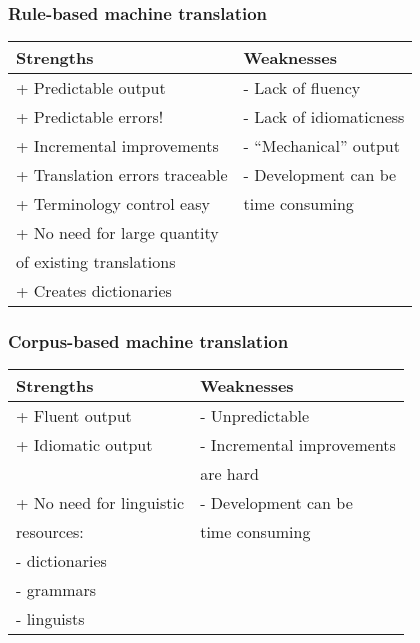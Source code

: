 \documentclass{beamer}
\begin{document}
\begin{frame}
  \frametitle{Rule-based machine translation}

\centering
\begin{tabular}{l|l}
\textbf{Strengths} & \textbf{Weaknesses}\\
\hline
+ Predictable output & - Lack of fluency \\
+ Predictable errors! & - Lack of idiomaticness \\
+ Incremental improvements & - ``Mechanical'' output \\ 
+ Translation errors traceable & - Development can be \\
+ Terminology control easy & \hfill time consuming \\
+ No need for large quantity & \\
\hfill of existing translations& \\
    + Creates dictionaries & \\
\hline
\end{tabular}


\end{frame}

\begin{frame}
  \frametitle{Corpus-based machine translation}

\centering
\begin{tabular}{l|l}
\textbf{Strengths} & \textbf{Weaknesses}\\
\hline
+ Fluent output & - Unpredictable \\
+ Idiomatic output & - Incremental improvements\\
                       & \hfill are hard \\
+ No need for linguistic & - Development can be \\
\hfill resources: & \hfill time consuming\\
\hfill - dictionaries & \\
\hfill- grammars & \\
\hfill- linguists  & \\
\hline
\end{tabular}

\end{frame}
\end{document}
